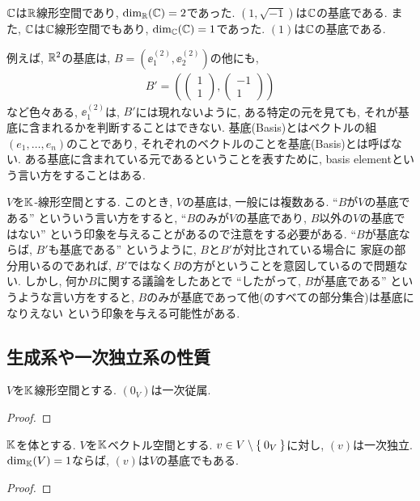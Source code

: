 \begin{example}
  $\mathbb{C}$は$\mathbb{R}$線形空間であり,
  $\dim_{\mathbb{R}}(\mathbb{C}) = 2$であった.
  $(1,\sqrt{-1})$は$\mathbb{C}$の基底である.
  また,
  $\mathbb{C}$は$\mathbb{C}$線形空間でもあり,
  $\dim_{\mathbb{C}}(\mathbb{C}) = 1$であった.
  $(1)$は$\mathbb{C}$の基底である.  
\end{example}

\begin{remark}
例えば, $\mathbb{R}^2$の基底は,
$B=(\ee^{(2)}_1,\ee^{(2)}_2)$の他にも,
\begin{align*}
B'=(\begin{pmatrix}1\\1\end{pmatrix},\begin{pmatrix}-1\\1\end{pmatrix})
\end{align*}
など色々ある,
$\ee^{(2)}_1$は,
$B'$には現れないように,
ある特定の元を見ても,
それが基底に含まれるかを判断することはできない.
基底(Basis)とはベクトルの組$(e_1,\ldots,e_n)$のことであり,
それぞれのベクトルのことを基底(Basis)とは呼ばない.
ある基底に含まれている元であるということを表すために,
basis elementという言い方をすることはある.
\end{remark}

\begin{note}
$V$を$\mathbb{K}$-線形空間とする.
このとき,
$V$の基底は,
一般には複数ある.
``$B$が$V$の基底である''
といういう言い方をすると,
``$B$のみが$V$の基底であり, $B$以外の$V$の基底ではない''
という印象を与えることがあるので注意をする必要がある.
``$B$が基底ならば, $B'$も基底である''
というように,
$B$と$B'$が対比されている場合に
家庭の部分用いるのであれば,
$B'$ではなく$B$の方がということを意図しているので問題ない.
しかし,
何か$B$に関する議論をしたあとで
``したがって, $B$が基底である''
というような言い方をすると,
$B$のみが基底であって他(のすべての部分集合)は基底になりえない
という印象を与える可能性がある.
\end{note}

\subsection{生成系や一次独立系の性質}
\begin{prop}
  $V$を$\mathbb{K}$線形空間とする.
  $(0_V)$は一次従属.
\end{prop}
\begin{proof}\end{proof}

\begin{prop}
  $\mathbb{K}$を体とする.
  $V$を$\mathbb{K}$ベクトル空間とする.
  $v\in V\setminus\Set{0_V}$に対し,
  $(v)$は一次独立.
  $\dim_{\mathbb{K}}(V)=1$ならば, $(v)$は$V$の基底でもある.
\end{prop}
\begin{proof}\end{proof}

